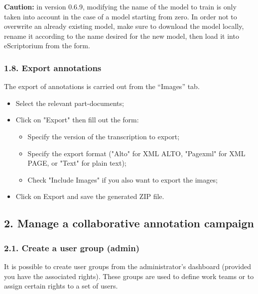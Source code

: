 \documentclass[
]{book}
\begin{document}
\textbf{Caution:} in version 0.6.9, modifying the name of the model to train
is only taken into account in the case of a model starting from zero. In
order not to overwrite an already existing model, make sure to download
the model locally, rename it according to the name desired for the new
model, then load it into eScriptorium from the form.

\hypertarget{export-annotations}{%
\subsubsection{1.8. Export annotations}\label{export-annotations}}

The export of annotations is carried out from the ``Images'' tab.

\begin{itemize}
\item
  Select the relevant part-documents;
\item
  Click on "Export" then fill out the form:

  \begin{itemize}
  \item
    Specify the version of the transcription to export;
  \item
    Specify the export format ("Alto" for XML ALTO, "Pagexml"
    for XML PAGE, or "Text" for plain text);
  \item
    Check "Include Images" if you also want to export the images;
  \end{itemize}
\item
  Click on Export and save the generated ZIP file.
\end{itemize}

\hypertarget{manage-a-collaborative-annotation-campaign}{%
\subsection{2. Manage a collaborative annotation campaign}\label{manage-a-collaborative-annotation-campaign}}

\hypertarget{create-a-user-group-admin}{%
\subsubsection{2.1. Create a user group (admin)}\label{create-a-user-group-admin}}

It is possible to create user groups from the administrator's dashboard
(provided you have the associated rights). These groups are used to
define work teams or to assign certain rights to a set of users.
\end{document}
